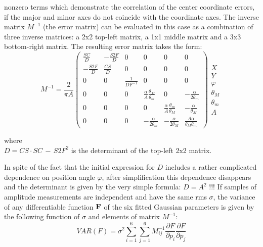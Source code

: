 nonzero terms which demonstrate the correlation of the center
coordinate errors, if the major and minor axes  do not coincide with
the coordinate axes. The inverse matrix $M^{-1}$ (the error matrix)
can be evaluated in this case as a combination of three inverse
matrices: a 2x2 top-left matrix, a 1x1 middle matrix and a 3x3
bottom-right matrix. The resulting error matrix takes the form:
\pagebreak
\begin{equation}
M^{-1} = \frac{2}{\pi A}
\left(
\begin{array}{cccccc}
\frac{SC}{D}  & -\frac{S2F}{D} & 0 & 0 & 0 & 0 \\
-\frac{S2F}{D} & \frac{CS}{D}  & 0 & 0 & 0 & 0 \\
0 & 0 & \frac{1}{DF^{-1}} & 0 & 0 & 0 \\
0 & 0 & 0 & \frac{\alpha}{A}\frac{\theta_M}{\theta_m}
  & 0 & -\frac{\alpha}{2\theta_m}\\

0 & 0 & 0 & 0 & \frac{\alpha}{A}\frac{\theta_m}{\theta_M}
   & -\frac{\alpha}{\theta_M}\\
0 & 0 & 0 & -\frac{\alpha}{2\theta_m}& -\frac{\alpha}{2\theta_M}
  &  \frac{A \alpha}{\theta_M \theta_m}
\label{eq:m-1}
\end{array}
\right)
\begin{array}{c}
X \\ Y \\ \varphi \\ \theta_M\\ \theta_m\\ A
\end{array}
\end{equation}
\begin{tabbing}
where~\= \\
\> $D = CS \cdot SC \,-\, S2F^2$ is the determinant of the top-left 2x2 matrix.
\end{tabbing}
In spite of the fact that the initial expression for $D$ includes a
rather complicated dependence on position angle $\varphi$, after
simplification this dependence disappears and the determinant is given
by the very simple formula: $D = A^2$ !!!
If samples of amplitude measurements are independent and have the same
rms $\sigma$, the variance of any differentiable function ${\bf F}$ of
the six fitted Gaussian parameters is given by the following function
of  $\sigma$ and elements of matrix $M^{-1}$:
\begin{equation}
VAR(F) = \sigma ^2 \sum_{i=1}^{6}
\sum_{j=1}^{6} M_{ij}^{-1} \frac {\partial F}
{\partial p_i} \frac {\partial F}{\partial p_j}
\label{eq:sum}
\end{equation}
